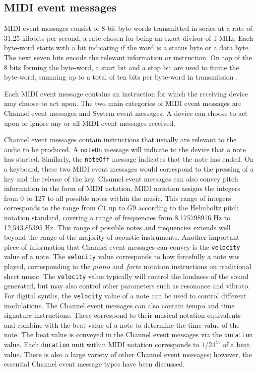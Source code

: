 \documentclass[a4paper,12pt]{report}
\begin{document}
\subsection{MIDI event messages}
\label{subsec:midieventmsg}

MIDI event messages consist of 8-bit byte-words transmitted in series at a rate of 31.25 kilobits per second, a rate chosen for being an exact divisor of 1 MHz. Each byte-word starts with a bit indicating if the word is a status byte or a data byte. The next seven bits encode the relevant information or instruction. On top of the 8 bits forming the byte-word, a start bit and a stop bit are used to frame the byte-word, summing up to a total of ten bits per byte-word in transmission \cite{midispec}. 

Each MIDI event message contains an instruction for which the receiving device may choose to act upon. The two main categories of MIDI event messages are Channel event messages and System event messages. A device can choose to act upon or ignore any or all MIDI event messages received.

Channel event messages contain instructions that usually are relevant to the audio to be produced. A \texttt{note\-On} message will indicate to the device that a note has started. Similarly, the \texttt{note\-Off} message indicates that the note has ended. On a keyboard, these two MIDI event messages would correspond to the pressing of a key and the release of the key. Channel event messages can also convey pitch information in the form of MIDI notation. MIDI notation assigns the integers from 0 to 127 to all possible notes within the music. This range of integers corresponds to the range from $C1$ up to $G9$ according to the Helmholtz pitch notation standard, covering a range of frequencies from 8.175798916 Hz to 12,543.85395 Hz. This range of possible notes and frequencies extends well beyond the range of the majority of acoustic instruments. Another important piece of information that Channel event messages can convey is the \texttt{velocity} value of a note. The \texttt{velocity} value corresponds to how forcefully a note was played, corresponding to the $piano$ and $forte$ notation instructions on traditional sheet music. The \texttt{velocity} value typically will control the loudness of the sound generated, but may also control other parameters such as resonance and vibrato. For digital synths, the \texttt{velocity} value of a note can be used to control different modulations. The Channel event messages can also contain tempo and time signature instructions. These correspond to their musical notation equivalents and combine with the beat value of a note to determine the time value of the note. The beat value is conveyed in the Channel event messages via the \texttt{duration} value. Each \texttt{duration} unit within MIDI notation corresponds to $1/24^{th}$ of a beat value. There is also a large variety of other Channel event messages; however, the essential Channel event message types have been discussed.
\end{document}
